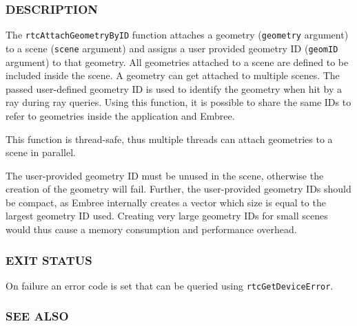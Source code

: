 \begin{Shaded}
\begin{Highlighting}[]

\OperatorTok{(}
\OperatorTok{,}
\OperatorTok{,}
   
\OperatorTok{);}
\end{Highlighting}
\end{Shaded}

\subsubsection{DESCRIPTION}\label{description}

The \texttt{rtcAttachGeometryByID} function attaches a geometry
(\texttt{geometry} argument) to a scene (\texttt{scene} argument) and
assigns a user provided geometry ID (\texttt{geomID} argument) to that
geometry. All geometries attached to a scene are defined to be included
inside the scene. A geometry can get attached to multiple scenes. The
passed user-defined geometry ID is used to identify the geometry when
hit by a ray during ray queries. Using this function, it is possible to
share the same IDs to refer to geometries inside the application and
Embree.

This function is thread-safe, thus multiple threads can attach
geometries to a scene in parallel.

The user-provided geometry ID must be unused in the scene, otherwise the
creation of the geometry will fail. Further, the user-provided geometry
IDs should be compact, as Embree internally creates a vector which size
is equal to the largest geometry ID used. Creating very large geometry
IDs for small scenes would thus cause a memory consumption and
performance overhead.

\subsubsection{EXIT STATUS}\label{exit-status}

On failure an error code is set that can be queried using
\texttt{rtcGetDeviceError}.

\subsubsection{SEE ALSO}\label{see-also}

